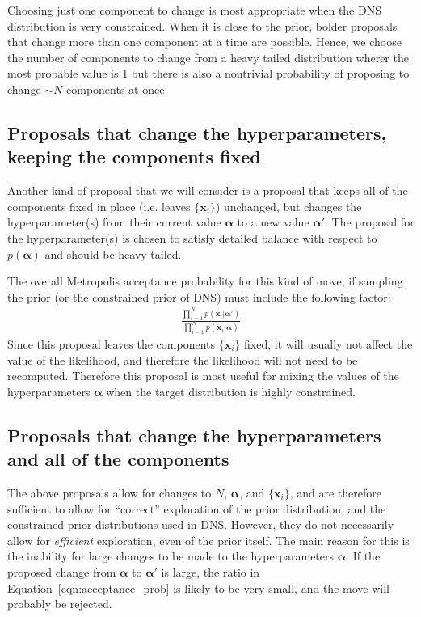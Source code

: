 \documentclass[letterpaper, 11pt]{article}
\newcommand{\hyperparams}{\boldsymbol{\alpha}}
\newcommand{\xx}{\mathbf{x}}
\begin{document}
Choosing just one component to change is most appropriate when the DNS
distribution is very constrained. When it is close to the prior, bolder
proposals that change more than one component at a time are possible. Hence,
we choose the number of components to change from a heavy tailed distribution
wherer the most probable value is 1 but there is also a nontrivial probability
of proposing to change $\sim N$ components at once.

\subsection{Proposals that change the hyperparameters,
keeping the components fixed}\label{sec:proposal3}
Another kind of proposal that we will consider is a proposal that keeps all of
the components fixed in place (i.e. leaves $\{\xx_i\}$) unchanged, but changes
the hyperparameter(s) from their current value $\hyperparams$
to a new value $\hyperparams'$. The proposal for the hyperparameter(s) is chosen
to satisfy detailed balance with respect to $p(\hyperparams)$ and should be
heavy-tailed.

The overall Metropolis acceptance probability
for this kind of move, if sampling the prior (or the constrained prior of DNS)
must include the following factor:
\begin{eqnarray}
\frac{\prod_{i=1}^N p(\xx_i | \hyperparams')}{\prod_{i=1}^N p(\xx_i | \hyperparams)}
\label{eqn:acceptance_prob}
\end{eqnarray}
Since this proposal leaves the components $\{\xx_i\}$ fixed, it will usually not
affect the value of the likelihood, and therefore the likelihood will not need
to be recomputed. Therefore this proposal is most useful for mixing the values
of the hyperparameters $\hyperparams$ when the target distribution is highly
constrained.

\subsection{Proposals that change the hyperparameters
and all of the components}\label{sec:proposal4}
The above proposals allow for changes to $N$, $\hyperparams$, and $\{\xx_i\}$,
and are therefore sufficient to allow for ``correct'' exploration of the
prior distribution, and the constrained prior distributions used in DNS.
However, they do not necessarily allow for {\it efficient} exploration, even
of the prior itself. The main reason for this is the inability for large
changes to be made to the hyperparameters $\hyperparams$. If the proposed change
from $\hyperparams$ to $\hyperparams'$ is large, the ratio in
Equation~\ref{eqn:acceptance_prob} is likely to be very small, and the move
will probably be rejected.
\end{document}
